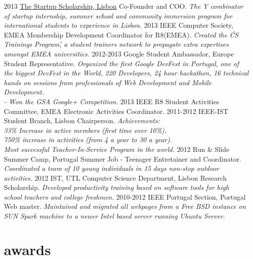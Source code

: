 \documentclass[]{friggeri-cv}
\begin{document}
\begin{entrylist} 
  \entry
    {2013}
    {\href{http://startupscholarship.org/}{The Startup Scholarship, Lisbon}}
    {Co-Founder and COO.}
    {\emph{The Y combinator of startup internship, summer school and community immersion program for international students to experience in Lisbon.}}
  \entry
    {2013}
    {IEEE Computer Society, EMEA}
    {Membership Development Coordinator for R8(EMEA).}
    {\emph{Created the \'CS Trainings Program\', a student trainers network to propagate extra expertises amongst EMEA universities.}}    
  \entry
    {2012-2013}
    {Google Student Ambassador, Europe}
    {Student Representative.}
    {\emph{Organized the first Google DevFest in Portugal, one of the biggest DevFest in the World, 220 Developers, 24 hour hackathon, 16 technical hands on sessions from professionals of Web Development and Mobile Development.\\
    - Won the GSA Google+ Competition.}}
  \entry
    {2013}
    {IEEE R8 Student Activities Committee, EMEA}
    {Electronic Activities Coordinator.}
    {\emph{}}
  \entry
    {2011-2012}
    {IEEE-IST Student Branch, Lisbon}
    {Chairperson.}
    {\emph{Achievements:  \\
      33\% Increase in active members (first time over 10\%).\\
      750\% increase in activities (from 4 a year to 30 a year).\\
      Most successful Teacher-In-Service Program in the world.}}      
  \entry
     {2012}
     {Run \& Slide Summer Camp, Portugal}
     {Summer Job - Teenager Entretainer and Coordinator.}
     {\emph{Coordinated a team of 10 young individuals in 15 days non-stop outdoor activities.}}
  \entry
    {2012}
    {IST, UTL Computer Science Department, Lisbon}
    {Research Scholarship.}
    {\emph{Developed productivity training based on software tools for high school teachers and college freshmen.}}
  \entry
    {2010-2012}
    {IEEE Portugal Section, Portugal}
    {Web master.}
    {\emph{Maintained and migrated all webpages from a Free BSD instance on SUN Spark machine to a newer Intel based server running Ubuntu Server.}}

\end{entrylist}

\section{awards}
\end{document}
